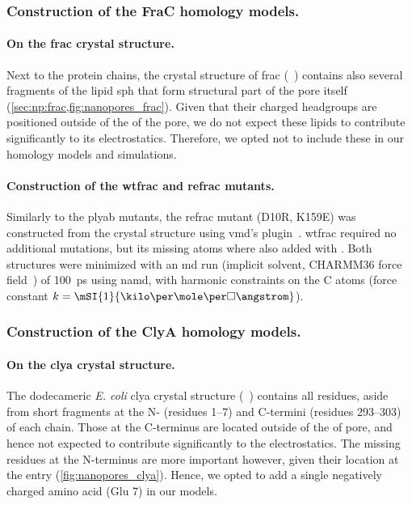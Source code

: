 \subsubsection{Construction of the FraC homology models.}
%

\paragraph{On the \gls{frac} crystal structure.}
%
Next to the protein chains, the crystal structure of \gls{frac} (~\cite{Tanaka-2015}) contains
also several fragments of the lipid \gls{sph} that form structural part of the pore itself
(\cref{sec:np:frac,fig:nanopores_frac}). Given that their charged headgroups are positioned outside of the
\lumen{} of the pore, we do not expect these lipids to contribute significantly to its electrostatics.
Therefore, we opted not to include these in our homology models and simulations.

\paragraph{Construction of the \gls{wtfrac} and \gls{refrac} mutants.}
%
Similarly to the \gls{plyab} mutants, the \gls{refrac} mutant (D10R, K159E) was constructed from the crystal
structure using \gls{vmd}'s  plugin~\cite{Humphrey-1996}. \Gls{wtfrac} required no additional
mutations, but its missing atoms where also added with . Both structures were minimized with an
\gls{md} run (implicit solvent, CHARMM36 force field~\cite{Best-2012}) of \SI{100}{\ps} using \gls{namd}, with
harmonic constraints on the C\ta{} atoms (force constant $k=\mSI{1}{\kilo\cal\per\mole\per\square\angstrom}$).


\subsubsection{Construction of the ClyA homology models.}
%

\paragraph{On the \gls{clya} crystal structure.}
%
The dodecameric \textit{E. coli} \gls{clya} crystal structure (~\cite{Mueller-2009}) contains all
residues, aside from short fragments at the N- (residues \numrange{1}{7}) and C-termini (residues
\numrange{293}{303}) of each chain. Those at the C-terminus are located outside of the \lumen{} of pore, and
hence not expected to contribute significantly to the electrostatics. The missing residues at the N-terminus
are more important however, given their location at the \transi{} entry (\cref{fig:nanopores_clya}). Hence, we
opted to add a single negatively charged amino acid (Glu 7) in our models.

